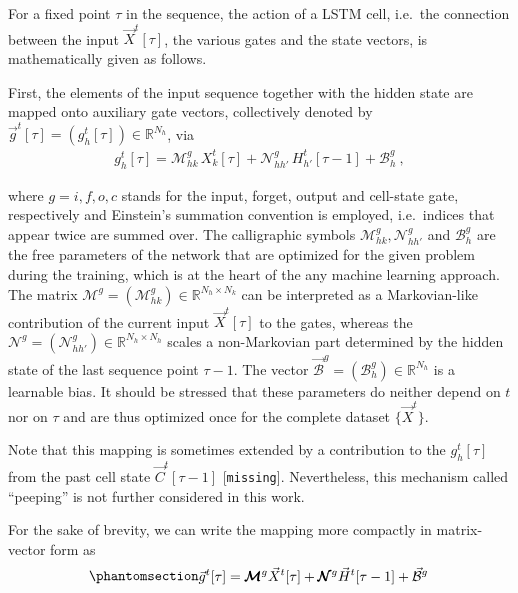 \documentclass[
]{agujournal2019}
\begin{document}
For a fixed point \(\tau\) in the sequence, the action of a LSTM cell,
i.e.~the connection between the input \(\vec{X}^t[\tau]\), the various
gates and the state vectors, is mathematically given as follows.

First, the elements of the input sequence together with the hidden state
are mapped onto auxiliary gate vectors, collectively denoted by
\(\vec{g}^t[\tau] = (g^t_h[\tau]) \in \mathbb{R}^{N_h}\), via \[
\begin{aligned}
g_h^t[\tau] =  \mathcal{M}^{g}_{hk} \, X^t_k[\tau] +  \mathcal{N}^{g}_{hh'} \, H^t_{h'}[\tau-1] + \mathcal{B}^g_{h} \ ,
\end{aligned}
\]

where \(g=i,f,o,c\) stands for the input, forget, output and cell-state
gate, respectively and Einstein's summation convention is employed,
i.e.~indices that appear twice are summed over. The calligraphic symbols
\(\mathcal{M}^{g}_{hk}, \mathcal{N}^{g}_{hh'}\) and
\(\mathcal{B}^g_{h}\) are the free parameters of the network that are
optimized for the given problem during the training, which is at the
heart of the any machine learning approach. The matrix
\(\pmb{\mathcal{M}}^{g} = (\mathcal{M}^{g}_{hk}) \in \mathbb{R}^{N_h \times N_k}\)
can be interpreted as a Markovian-like contribution of the current input
\(\vec{X}^t[\tau]\) to the gates, whereas the
\(\pmb{\mathcal{N}}^{g} = (\mathcal{N}^{g}_{hh'}) \in \mathbb{R}^{N_h \times N_h}\)
scales a non-Markovian part determined by the hidden state of the last
sequence point \(\tau-1\). The vector
\(\vec{\mathcal{B}}^g = (\mathcal{B}^g_{h}) \in \mathbb{R}^{N_h}\) is a
learnable bias. It should be stressed that these parameters do neither
depend on \(t\) nor on \(\tau\) and are thus optimized once for the
complete dataset \(\{\vec{X}^t\}\).

Note that this mapping is sometimes extended by a contribution to the
\(g_h^t[\tau]\) from the past cell state \(\vec{C}^t[\tau-1]\)
{[}\texttt{missing}{]}. Nevertheless, this mechanism called ``peeping''
is not further considered in this work.

For the sake of brevity, we can write the mapping more compactly in
matrix-vector form as
\begin{equation}\phantomsection\label{eq-LSTM-gates}{
\begin{aligned}
\vec{g}^t[\tau] = \pmb{\mathcal{M}}^{g}\vec{X}^t[\tau] + \pmb{\mathcal{N}}^{g}  \vec{H}^t[ \tau-1]+ \vec{\mathcal{B}}^g \,
\end{aligned}
}\end{equation}
\end{document}
